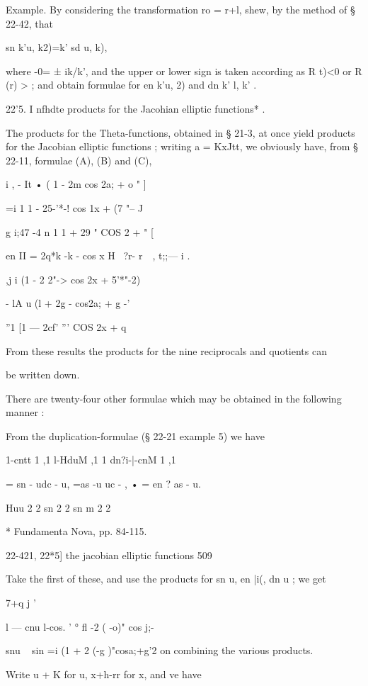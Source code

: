 Example. By considering the transformation ro = r+l, shew, by the
method of § 22-42, that

sn k'u, k2)=k' sd u, k),

where -0= ± ik/k', and the upper or lower sign is taken according as R
t)<0 or R (r) > ; and obtain formulae for en k'u, 2) and dn k' l, k' .

22'5. I nfhdte products for the Jacohian elliptic functions* .

The products for the Theta-functions, obtained in § 21-3, at once
yield products for the Jacobian elliptic functions ; writing a =
KxJtt, we obviously have, from § 22-11, formulae (A), (B) and (C),

  i , - It • ( 1 - 2m cos 2a; + o " ]

   =i 1 1 - 25-'*-! cos 1x + (7 "-- J

g i;47 -4 n 1 1 + 29 " COS 2 + " [

en II = 2q*k -k - cos x H \ ?r- r~~, t;;— i .

  ,j i (1 - 2 2"-> cos 2x + 5'*"-2)

- lA u (l + 2g - cos2a; + g -'



''1 [1 — 2cf' ''' COS 2x + q

From these results the products for the nine reciprocals and quotients
can

be written down.

There are twenty-four other formulae which may be obtained in the
following manner :

From the duplication-formulae (§ 22-21 example 5) we have

1-cntt 1 ,1 l-HduM ,1 1 dn?i-|-cnM 1 ,1

= sn - udc - u, =as -u uc - , • = en ? as - u.

Huu 2 2 sn 2 2 sn m 2 2

* Fundamenta Nova, pp. 84-115.



22-421, 22*5] the jacobian elliptic functions 509

Take the first of these, and use the products for sn u, en |i(, dn u ;
we get

7+q j '



l — cnu l-cos. ' ° fl -2 ( -o)" cos j;-



snu ~ sin =i (1 + 2 (-g )"cosa;+g'2 on combining the various products.

Write u + K for u, x+h-rr for x, and ve have

